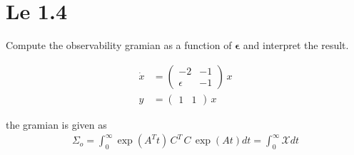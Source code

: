\section{Le 1.4} 
Compute the observability gramian as a function of $\mathbf{\epsilon}$ and interpret the result.
\newcommand{\gramian}{\begin{pmatrix}
    \sigma_{1} & \sigma_{2} \\
    \sigma_{2} & \sigma_{3}
\end{pmatrix}}

\begin{align*}
    \dot x &= \begin{pmatrix}
        -2 & -1 \\
        \epsilon & -1
    \end{pmatrix}\,x \\
    y &= \begin{pmatrix}
        1 & 1
    \end{pmatrix}\,x
\end{align*}

the gramian is given as
\begin{align}
    \Sigma_o = \int_{0}^{\infty} \exp\left(A^Tt\right)\,C^T\,C\,\exp\left(At\right) dt = \int_{0}^{\infty} \mathcal{X} dt \label{eq:le41}
\end{align}

